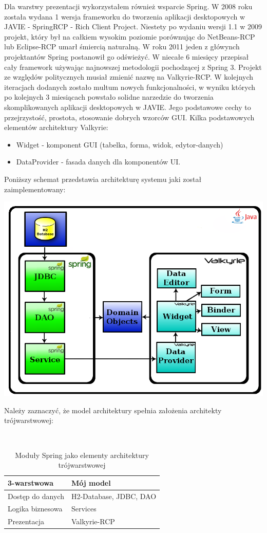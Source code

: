 Dla warstwy prezentacji wykorzystałem również wsparcie Spring. W 2008 roku została wydana 1 wersja frameworku do tworzenia aplikacji desktopowych w JAVIE - SpringRCP - Rich Client Project. Niestety po wydaniu wersji 1.1 w 2009 projekt, który był na całkiem wysokim poziomie porównując do NetBeans-RCP lub Eclipse-RCP umarł śmiercią naturalną. W roku 2011 jeden z główynch projektantów Spring postanowił go odświeżyć. W niecałe 6 miesięcy przepisał cały framework używając najnowszej metodologii pochodzącej z Spring 3. Projekt ze względów politycznych musiał zmienić nazwę na Valkyrie-RCP. W kolejnych iteracjach dodanych zostało multum nowych funkcjonalności, w wyniku których po kolejnych 3 miesiącach powstało solidne narzedzie do tworzenia skomplikowanych aplikacji desktopowych w JAVIE. Jego podstawowe cechy to przejrzystość, prostota, stosowanie dobrych wzorców GUI. Kilka podstawowych elementów architektury Valkyrie:
\begin{itemize}
 \item Widget - komponent GUI (tabelka, forma, widok, edytor-danych)
 \item DataProvider - fasada danych dla komponentów UI.
\end{itemize}
Poniższy schemat przedstawia architekturę systemu jaki został zaimplementowany:

\includegraphics[scale=0.4]{images/spring-layers2}

Należy zaznaczyć, że model architektury spełnia założenia architekty trójwarstwowej:
\begin{table}[h]
 \caption{Moduły Spring jako elementy architektury trójwarstwowej}
 \small\tt
 \centering
 \vspace{0in}
 \begin{tabular}{|l|l|}
 \hline
 \textbf{3-warstwowa} & \textbf{Mój model} \\ 
 \hline
 Dostęp do danych & H2-Database, JDBC, DAO \\
 \hline
 Logika biznesowa & Services \\
 \hline
 Prezentacja & Valkyrie-RCP \\
 \hline
 \end{tabular}
\end{table}


